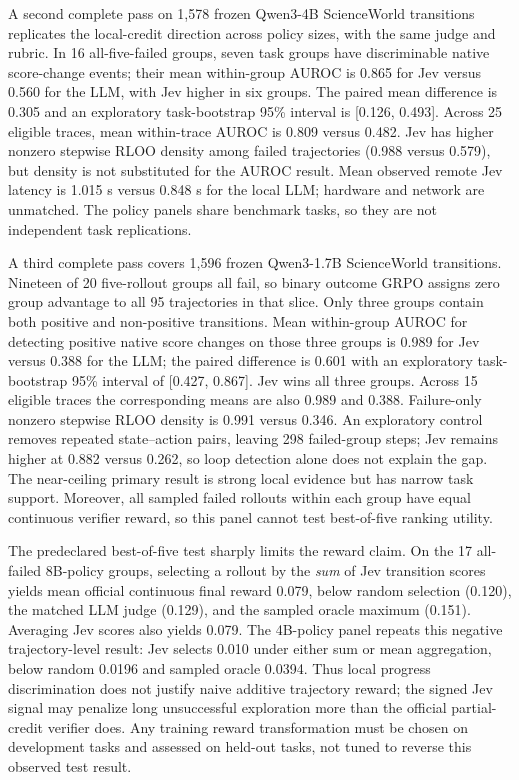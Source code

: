 \documentclass{article}
\begin{document}
A second complete pass on 1,578 frozen Qwen3-4B ScienceWorld transitions replicates the local-credit direction across policy sizes, with the same judge and rubric. In 16 all-five-failed groups, seven task groups have discriminable native score-change events; their mean within-group AUROC is 0.865 for Jev versus 0.560 for the LLM, with Jev higher in six groups. The paired mean difference is 0.305 and an exploratory task-bootstrap 95\% interval is [0.126, 0.493]. Across 25 eligible traces, mean within-trace AUROC is 0.809 versus 0.482. Jev has higher nonzero stepwise RLOO density among failed trajectories (0.988 versus 0.579), but density is not substituted for the AUROC result. Mean observed remote Jev latency is 1.015 s versus 0.848 s for the local LLM; hardware and network are unmatched. The policy panels share benchmark tasks, so they are not independent task replications.

A third complete pass covers 1,596 frozen Qwen3-1.7B ScienceWorld transitions. Nineteen of 20 five-rollout groups all fail, so binary outcome GRPO assigns zero group advantage to all 95 trajectories in that slice. Only three groups contain both positive and non-positive transitions. Mean within-group AUROC for detecting positive native score changes on those three groups is 0.989 for Jev versus 0.388 for the LLM; the paired difference is 0.601 with an exploratory task-bootstrap 95\% interval of [0.427, 0.867]. Jev wins all three groups. Across 15 eligible traces the corresponding means are also 0.989 and 0.388. Failure-only nonzero stepwise RLOO density is 0.991 versus 0.346. An exploratory control removes repeated state--action pairs, leaving 298 failed-group steps; Jev remains higher at 0.882 versus 0.262, so loop detection alone does not explain the gap. The near-ceiling primary result is strong local evidence but has narrow task support. Moreover, all sampled failed rollouts within each group have equal continuous verifier reward, so this panel cannot test best-of-five ranking utility.

The predeclared best-of-five test sharply limits the reward claim. On the 17 all-failed 8B-policy groups, selecting a rollout by the \emph{sum} of Jev transition scores yields mean official continuous final reward 0.079, below random selection (0.120), the matched LLM judge (0.129), and the sampled oracle maximum (0.151). Averaging Jev scores also yields 0.079. The 4B-policy panel repeats this negative trajectory-level result: Jev selects 0.010 under either sum or mean aggregation, below random 0.0196 and sampled oracle 0.0394. Thus local progress discrimination does not justify naive additive trajectory reward; the signed Jev signal may penalize long unsuccessful exploration more than the official partial-credit verifier does. Any training reward transformation must be chosen on development tasks and assessed on held-out tasks, not tuned to reverse this observed test result.
\end{document}
